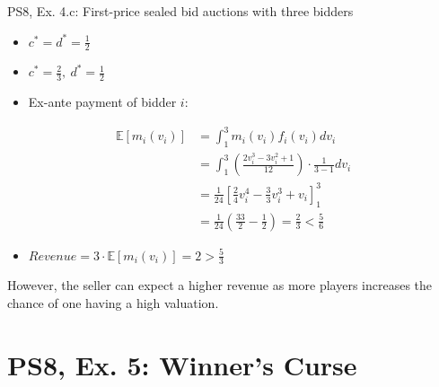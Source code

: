 \begin{frame}{PS8, Ex. 4.c: First-price sealed bid auctions with three bidders}
\begin{multicols}{2}
\begin{itemize}
        \item[(3.a)] $c^*=d^*=\frac{1}{2}$
        \item[(4.a)] $c^*=\frac{2}{3},\ d^*=\frac{1}{2}$
        \item[\nth{2}:] Ex-ante payment of bidder $i$:
      \end{itemize}
      \vspace{-12pt}
      \begin{align*}
        \mathbb{E}[m_i(v_i)]&=\textstyle\int_1^3m_i(v_i)f_i(v_i)dv_i\\
                            &=\textstyle\int_1^3\left(\frac{2v_i^3-3v_i^2+1}{12}\right)\cdot\frac{1}{3-1}dv_i\\
                            &=\frac{1}{24}\left[\frac{2}{4}v_i^4-\frac{3}{3}v_i^3+v_i\right]_1^3\\
                            &=\frac{1}{24}\left(\frac{33}{2}-\frac{1}{2}\right)=\frac{2}{3}<\frac{5}{6}
      \end{align*}
      \vspace{-12pt}
      \begin{itemize}
        \item[\nth{3}:] $Revenue=3\cdot\mathbb{E}[m_i(v_i)]=2>\frac{5}{3}$
      \end{itemize}
      \vspace{-8pt}
      However, the seller can expect a higher revenue as more players increases the chance of one having a high valuation.
      \vfill\null
    \end{multicols}
    \vfill\null
\end{frame}


\section{PS8, Ex. 5: Winner's Curse}

